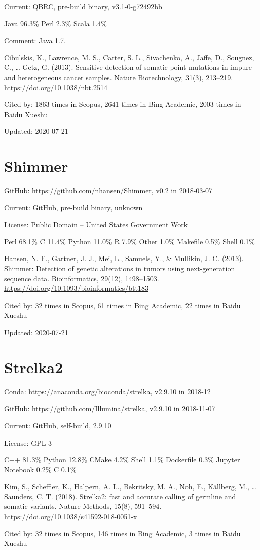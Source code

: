 \documentclass[]{article}
\newcommand{\cb}[3]{\par Cited by: {\color{blue}\Huge #1} times in Scopus, {\color{blue}\Huge #2} times in Bing Academic, {\color{blue}\Huge #3} times in Baidu Xueshu}
\begin{document}
Current: QBRC, pre-build binary, v3.1-0-g72492bb

Java 96.3\% Perl 2.3\% Scala 1.4\%

Comment: Java 1.7.

Cibulskis, K., Lawrence, M. S., Carter, S. L., Sivachenko, A., Jaffe, D., Sougnez, C., … Getz, G. (2013). Sensitive detection of somatic point mutations in impure and heterogeneous cancer samples. Nature Biotechnology, 31(3), 213–219. \url{https://doi.org/10.1038/nbt.2514}\cb{1863}{2641}{2003}

Updated: 2020-07-21

\section{Shimmer}

GitHub: \url{https://github.com/nhansen/Shimmer}, v0.2 in 2018-03-07

Current: GitHub, pre-build binary, unknown

License: Public Domain -- United States Government Work

Perl 68.1\% C 11.4\% Python 11.0\% R 7.9\% Other 1.0\% Makefile 0.5\% Shell 0.1\%

Hansen, N. F., Gartner, J. J., Mei, L., Samuels, Y., \& Mullikin, J. C. (2013). Shimmer: Detection of genetic alterations in tumors using next-generation sequence data. Bioinformatics, 29(12), 1498–1503. \url{https://doi.org/10.1093/bioinformatics/btt183}\cb{32}{61}{22}

Updated: 2020-07-21

\section{Strelka2}

Conda: \url{https://anaconda.org/bioconda/strelka}, v2.9.10 in 2018-12

GitHub: \url{https://github.com/Illumina/strelka}, v2.9.10 in 2018-11-07

Current: GitHub, self-build, 2.9.10

License: GPL 3

C++ 81.3\% Python 12.8\% CMake 4.2\% Shell 1.1\% Dockerfile 0.3\% Jupyter Notebook 0.2\% C 0.1\%

Kim, S., Scheffler, K., Halpern, A. L., Bekritsky, M. A., Noh, E., Källberg, M., … Saunders, C. T. (2018). Strelka2: fast and accurate calling of germline and somatic variants. Nature Methods, 15(8), 591–594. \url{https://doi.org/10.1038/s41592-018-0051-x}\cb{32}{146}{3}
\end{document}
